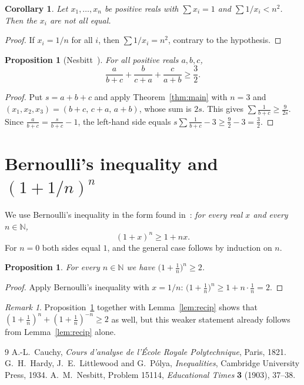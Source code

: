 \documentclass[11pt]{amsart}
\newtheorem{proposition}[theorem]{Proposition}
\newtheorem{corollary}[theorem]{Corollary}
\theoremstyle{definition}
\theoremstyle{remark}
\newtheorem*{remark}{Remark}
\begin{document}
\begin{corollary}\label{cor:vac}
Let $x_1,\dots,x_n$ be positive reals with $\sum x_i=1$ and
$\sum 1/x_i<n^2$. Then the $x_i$ are not all equal.
\end{corollary}

\begin{proof}
If $x_i=1/n$ for all $i$, then $\sum 1/x_i=n^2$, contrary to the hypothesis.
\end{proof}

\begin{proposition}[Nesbitt~\cite{Nes}]\label{prop:nesbitt}
For all positive reals $a,b,c$,
\[
  \frac{a}{b+c}+\frac{b}{c+a}+\frac{c}{a+b}\ge\frac32 .
\]
\end{proposition}

\begin{proof}
Put $s=a+b+c$ and apply Theorem~\ref{thm:main} with $n=3$ and
$(x_1,x_2,x_3)=(b+c,\,c+a,\,a+b)$, whose sum is $2s$. This gives
$\sum\frac{1}{b+c}\ge\frac{9}{2s}$. Since
$\frac{a}{b+c}=\frac{s}{b+c}-1$, the left-hand side equals
$s\sum\frac{1}{b+c}-3\ge\frac92-3=\frac32$.
\end{proof}

\section{Bernoulli's inequality and $(1+1/n)^n$}\label{sec:bern}

We use Bernoulli's inequality in the form found in~\cite{HLP}: \emph{for every
real $x$ and every $n\in\mathbb{N}$,}
\[
  (1+x)^n\ge 1+nx .
\]
For $n=0$ both sides equal $1$, and the general case follows by induction on
$n$.

\begin{proposition}\label{prop:e}
For every $n\in\mathbb{N}$ we have $\bigl(1+\frac1n\bigr)^n\ge 2$.
\end{proposition}

\begin{proof}
Apply Bernoulli's inequality with $x=1/n$:
$\bigl(1+\frac1n\bigr)^n\ge 1+n\cdot\frac1n=2$.
\end{proof}

\begin{remark}
Proposition~\ref{prop:e} together with Lemma~\ref{lem:recip} shows that
$(1+\frac1n)^n+(1+\frac1n)^{-n}\ge 2$ as well, but this weaker statement
already follows from Lemma~\ref{lem:recip} alone.
\end{remark}

\begin{thebibliography}{9}
 A.-L.~Cauchy, \emph{Cours d'analyse de l'\'Ecole Royale
Polytechnique}, Paris, 1821.
 G.~H.~Hardy, J.~E.~Littlewood and G.~P\'olya,
\emph{Inequalities}, Cambridge University Press, 1934.
 A.~M.~Nesbitt, Problem 15114, \emph{Educational Times}
\textbf{3} (1903), 37--38.
\end{thebibliography}
\end{document}
